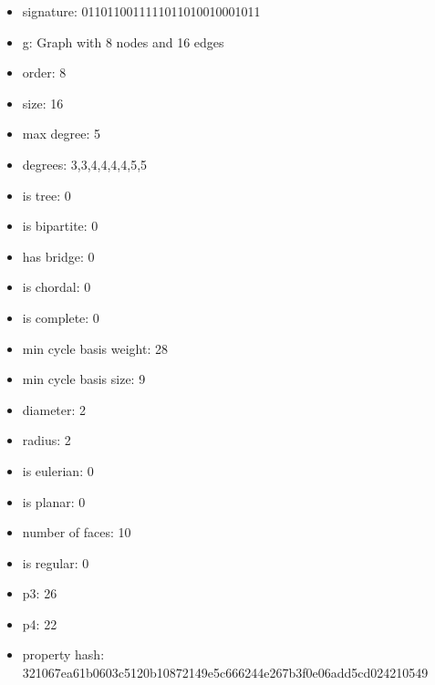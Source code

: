 \begin{itemize}
\item signature: 0110110011111011010010001011
\item g: Graph with 8 nodes and 16 edges
\item order: 8
\item size: 16
\item max degree: 5
\item degrees: 3,3,4,4,4,4,5,5
\item is tree: 0
\item is bipartite: 0
\item has bridge: 0
\item is chordal: 0
\item is complete: 0
\item min cycle basis weight: 28
\item min cycle basis size: 9
\item diameter: 2
\item radius: 2
\item is eulerian: 0
\item is planar: 0
\item number of faces: 10
\item is regular: 0
\item p3: 26
\item p4: 22
\item property hash: 321067ea61b0603c5120b10872149e5c666244e267b3f0e06add5cd024210549
\end{itemize}
\newpage
\begin{figure}
\end{figure}
